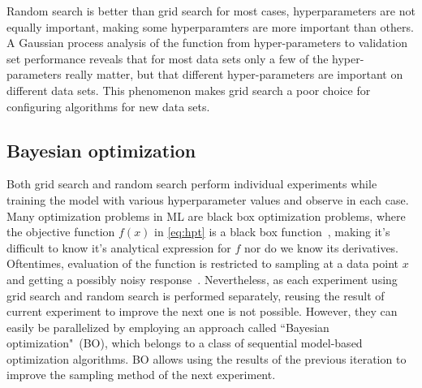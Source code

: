 \hspace*{3.5mm} Random search is better than grid search for most cases, hyperparameters are not equally important, making some hyperparamters are more important than others. A Gaussian process analysis of the function from hyper-parameters to validation set performance reveals that for most data sets only a few of the hyper-parameters really matter, but that different hyper-parameters are important on different data sets. This phenomenon makes grid search a poor choice for configuring algorithms for new data sets. %

\subsection{Bayesian optimization} 
Both grid search and random search perform individual experiments while training the model with various hyperparameter values and observe in each case. Many optimization problems in ML are black box optimization problems, where the objective function $f(x)$ in \cref{eq:hpt} is a black box function~\cite{BO}, making it's difficult to know it's analytical expression for $f$ nor do we know its derivatives. Oftentimes, evaluation of the function is restricted to sampling at a data point $x$ and getting a possibly noisy response~\cite{BO}.
Nevertheless, as each experiment using grid search and random search is performed separately, reusing the result of current experiment to improve the next one is not possible. However, they can easily be parallelized by employing an approach called ``Bayesian optimization"~(BO), which belongs to a class of sequential model-based optimization algorithms. BO allows using the results of the previous iteration to improve the sampling method of the next experiment.

